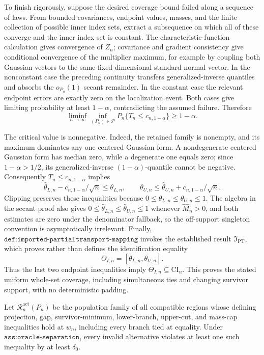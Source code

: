 To finish rigorously, suppose the desired coverage bound failed along a sequence of laws. From bounded covariances, endpoint values, masses, and the finite collection of possible inner index sets, extract a subsequence on which all of these converge and the inner index set is constant. The characteristic-function calculation gives convergence of \(Z_n\); covariance and gradient consistency give conditional convergence of the multiplier maximum, for example by coupling both Gaussian vectors to the same fixed-dimensional standard normal vector. In the nonconstant case the preceding continuity transfers generalized-inverse quantiles and absorbs the \(o_{P_n}(1)\) secant remainder. In the constant case the relevant endpoint errors are exactly zero on the localization event. Both cases give limiting probability at least \(1-\alpha\), contradicting the assumed failure. Therefore
\[
 \liminf_{n\to\infty}\inf_{(P_n)\in\mathcal P}
 P_n\{T_n\le c_{n,1-\alpha}\}\ge1-\alpha.
\]

The critical value is nonnegative. Indeed, the retained family is nonempty, and its maximum dominates any one centered Gaussian form. A nondegenerate centered Gaussian form has median zero, while a degenerate one equals zero; since \(1-\alpha>1/2\), its generalized-inverse \((1-\alpha)\)-quantile cannot be negative. Consequently \(T_n\le c_{n,1-\alpha}\) implies
\[
 \widehat\theta_{L,n}-c_{n,1-\alpha}/\sqrt n\le\theta_{L,n},
 \qquad
 \theta_{U,n}\le\widehat\theta_{U,n}+c_{n,1-\alpha}/\sqrt n.
\]
Clipping preserves these inequalities because \(0\le\theta_{L,n}\le\theta_{U,n}\le1\). The algebra in the secant proof also gives
\(0\le\widehat\theta_{L,n}\le\widehat\theta_{U,n}\le1\) whenever \(\widehat M_n>0\), and both estimates are zero under the denominator fallback, so the off-support singleton convention is asymptotically irrelevant. Finally, \(\texttt{def:imported-partialtransport-mapping}\) invokes the established result \(\mathfrak I_{\mathrm{PT}}\), which proves rather than defines the identification equality
\[
 \Theta_{I,n}=[\theta_{L,n},\theta_{U,n}].
\]
Thus the last two endpoint inequalities imply \(\Theta_{I,n}\subseteq\mathrm{CI}_n\). This proves the stated uniform whole-set coverage, including simultaneous ties and changing survivor support, with no deterministic padding.

Let \(\mathcal R_n^{\mathrm{act}}(P_n)\) be the population family of all compatible regions whose defining projection, gap, survivor-minimum, lower-branch, upper-cut, and mass-cap inequalities hold at \(w_n\), including every branch tied at equality. Under \(\texttt{ass:oracle-separation}\), every invalid alternative violates at least one such inequality by at least \(\delta_0\).

